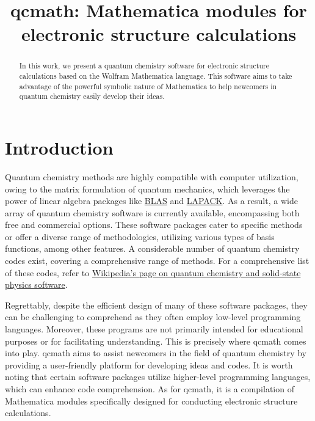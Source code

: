 \documentclass[aip,jcp,reprint,noshowkeys,superscriptaddress]{revtex4-1}
\begin{document}
	

\title{qcmath: Mathematica modules for electronic structure calculations}

\begin{abstract}
In this work, we present a quantum chemistry software for electronic structure calculations based on the Wolfram Mathematica language. This software aims to take advantage of the powerful symbolic nature of Mathematica to help newcomers in quantum chemistry easily develop their ideas. 
\end{abstract}

\maketitle

\section{Introduction}
Quantum chemistry methods are highly compatible with computer utilization, owing to the matrix formulation of quantum mechanics, which leverages the power of linear algebra packages like \href{https://www.netlib.org/blas/}{BLAS} and \href{https://www.netlib.org/lapack/}{LAPACK}. As a result, a wide array of quantum chemistry software is currently available, encompassing both free and commercial options. These software packages cater to specific methods or offer a diverse range of methodologies, utilizing various types of basis functions, among other features. A considerable number of quantum chemistry codes exist, covering a comprehensive range of methods. For a comprehensive list of these codes, refer to \href{https://en.wikipedia.org/wiki/List_of_quantum_chemistry_and_solid-state_physics_software}{Wikipedia's page on quantum chemistry and solid-state physics software}.

Regrettably, despite the efficient design of many of these software packages, they can be challenging to comprehend as they often employ low-level programming languages. Moreover, these programs are not primarily intended for educational purposes or for facilitating understanding. This is precisely where qcmath comes into play. qcmath aims to assist newcomers in the field of quantum chemistry by providing a user-friendly platform for developing ideas and codes. It is worth noting that certain software packages utilize higher-level programming languages, which can enhance code comprehension. As for qcmath, it is a compilation of Mathematica modules specifically designed for conducting electronic structure calculations.
\end{document}
